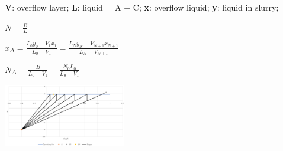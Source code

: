 \documentclass[12pt]{article}
\begin{document}
\begin{multicols}{2}
\textbf{V}: overflow layer;
\textbf{L}: liquid = A + C;
\textbf{x}: overflow liquid;
\textbf{y}: liquid in slurry;

$N=\frac{B}{L}$

$x_\Delta=\frac{L_0y_0-V_1x_1}{L_0-V_1}=\frac{L_Ny_N-V_{N+1}x_{N+1}}{L_N-V_{N+1}}$

$N_\Delta=\frac{B}{L_0-V_1}=\frac{N_0L_0}{L_0-V_1}$

\begin{center}
    \includegraphics[width=0.4\textwidth]{leach_stages.png}
\end{center}

\end{multicols}
\end{document}
